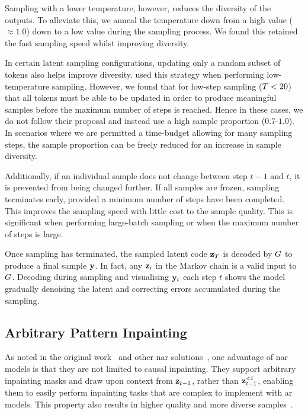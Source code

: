 Sampling with a lower temperature, however, reduces the diversity of the
outputs. To alleviate this, we anneal the temperature down from a high value
($\approx 1.0$) down to a low value during the sampling process. We found this
retained the fast sampling speed whilst improving diversity.

In certain latent sampling configurations, updating only a random subset of
tokens also helps improve diversity. \citet{savinov2022stepunrolled} used this
strategy when performing low-temperature sampling. However, we found that for
low-step sampling ($T<20$) that all tokens must be able to be updated
in order to produce meaningful samples before the maximum number of steps is
reached. Hence in these cases, we do not follow their proposal and instead use a
high sample proportion ($0.7$-$1.0$). In scenarios where we are permitted a
time-budget allowing for many sampling steps, the sample proportion
can be freely reduced for an increase in sample diversity.

Additionally, if an individual sample does not change between step $t-1$ and $t$,
it is prevented from being changed further. If all samples are frozen, sampling
terminates early, provided a minimum number of steps have been completed. This
improves the sampling speed with little cost to the sample quality. This
is significant when performing large-batch sampling or when the maximum number
of steps is large.

Once sampling has terminated, the sampled latent code $\mathbf{z}_T$ is
decoded by $G$ to produce a final sample $\mathbf{y}$. In fact, any
$\mathbf{z}_i$ in the Markov chain is a valid input to $G$. Decoding
during sampling and visualising $\mathbf{y}_t$ each step $t$ shows the model
gradually denoising the latent and correcting errors accumulated during the
sampling.

\subsection{Arbitrary Pattern Inpainting}
\label{subsec:inpainting}

As noted in the original work~\cite{savinov2022stepunrolled} and other \gls{nar}
solutions~\cite{bondtaylor2021unleashing}, one advantage of \gls{nar} models is
that they are not limited to causal inpainting. They support arbitrary
inpainting masks and draw upon context from $\mathbf{z}_{t-1}$, rather than
$\mathbf{z}_{t-1}^{<i}$, enabling them to easily perform inpainting tasks that are
complex to implement with \gls{ar} models. This property also results in 
higher quality and more diverse samples~\cite{bondtaylor2021unleashing}.

